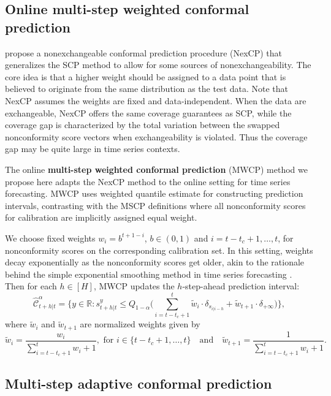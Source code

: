 \documentclass[
  11pt,
  12pt]{article}
\theoremstyle{plain}
\theoremstyle{remark}
\begin{document}
\subsection{Online multi-step weighted conformal
prediction}\label{online-multi-step-weighted-conformal-prediction}

\citet{barber2023} propose a nonexchangeable conformal prediction
procedure (NexCP) that generalizes the SCP method to allow for some
sources of nonexchangeability. The core idea is that a higher weight
should be assigned to a data point that is believed to originate from
the same distribution as the test data. Note that NexCP assumes the
weights are fixed and data-independent. When the data are exchangeable,
NexCP offers the same coverage guarantees as SCP, while the coverage gap
is characterized by the total variation between the swapped
nonconformity score vectors when exchangeability is violated. Thus the
coverage gap may be quite large in time series contexts.

The online \textbf{multi-step weighted conformal prediction} (MWCP)
method we propose here adapts the NexCP method to the online setting for
time series forecasting. MWCP uses weighted quantile estimate for
constructing prediction intervals, contrasting with the MSCP definitions
where all nonconformity scores for calibration are implicitly assigned
equal weight.

We choose fixed weights \(w_i = b^{t+1-i}\), \(b \in (0, 1)\) and
\(i=t-t_c+1,\ldots,t\), for nonconformity scores on the corresponding
calibration set. In this setting, weights decay exponentially as the
nonconformity scores get older, akin to the rationale behind the simple
exponential smoothing method in time series forecasting
\citep{hyndman2021}. Then for each \(h \in [H]\), MWCP updates the
\(h\)-step-ahead prediction interval: \[
\hat{\mathcal{C}}_{t+h|t}^{\alpha} = \Bigg\{y\in\mathbb{R}: s_{t+h|t}^{y} \leq Q_{1-\alpha}\Bigg(\sum_{i=t-t_c+1}^{t}\tilde{w}_i\cdot\delta_{s_{i|i-h}}+\tilde{w}_{t+1}\cdot\delta_{+\infty}\Bigg)\Bigg\},
\] where \(\tilde{w}_i\) and \(\tilde{w}_{t+1}\) are normalized weights
given by \[
\tilde{w}_i = \frac{w_i}{\sum_{i=t-t_c+1}^{t}w_i+1}, \text{ for } i \in \{t-t_c+1,\ldots,t\} \quad \text{and} \quad \tilde{w}_{t+1} =  \frac{1}{\sum_{i=t-t_c+1}^{t}w_i+1}.
\]

\subsection{Multi-step adaptive conformal
prediction}\label{multi-step-adaptive-conformal-prediction}
\end{document}
